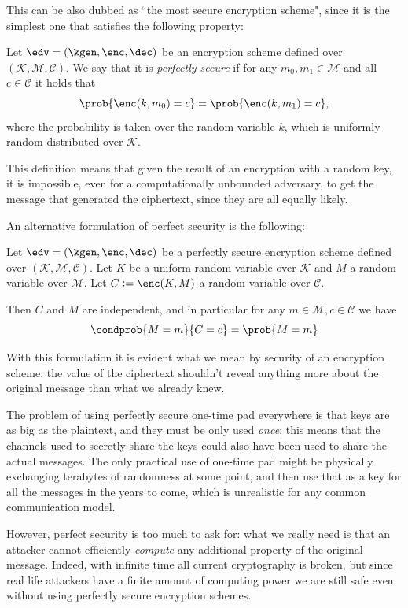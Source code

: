 This can be also dubbed as ``the most secure encryption scheme", since it is the simplest one that satisfies the following property:
\begin{definition}
    Let $\edv=(\kgen,\enc,\dec)$ be an encryption scheme defined over $(\mathcal K, \mathcal M, \mathcal C)$. We say that it is \emph{perfectly secure} if for any $m_0,m_1\in\mathcal M$ and all $c\in\mathcal C$ it holds that 
    $$\prob{\enc(k,m_0)=c} = \prob{\enc(k,m_1)=c},$$
    where the probability is taken over the random variable $k$, which is uniformly random distributed over $\mathcal K$.
\end{definition}

This definition means that given the result of an encryption with a random key, it is impossible, even for a computationally unbounded adversary, to get the message that generated the ciphertext, since they are all equally likely.

An alternative formulation of perfect security is the following:
\begin{proposition}
    Let $\edv=(\kgen,\enc,\dec)$ be a perfectly secure encryption scheme defined over $(\mathcal K, \mathcal M, \mathcal C)$. Let $K$ be a uniform random variable over $\mathcal K$ and $M$ a random variable over $\mathcal M$. Let $C:=\enc(K,M)$ a random variable over $\mathcal C$.
    
    Then $C$ and $M$ are independent, and in particular for any $m\in\mathcal M,c\in\mathcal C$ we have $$\condprob{M=m}{C=c} = \prob{M=m}$$
\end{proposition}

With this formulation it is evident what we mean by security of an encryption scheme: the value of the ciphertext shouldn't reveal anything more about the original message than what we already knew.

The problem of using  perfectly secure one-time pad everywhere is that keys are as big as the plaintext, and they must be only used \emph{once}; this means that the channels used to secretly share the keys could also have been used to share the actual messages. The only practical use of one-time pad might be physically exchanging terabytes of randomness at some point, and then use that as a key for all the messages in the years to come, which is unrealistic for any common communication model.

However, perfect security is too much to ask for: what we really need is that an attacker cannot efficiently \emph{compute} any additional property of the original message. Indeed, with infinite time all current cryptography is broken, but since real life attackers have a finite amount of computing power we are still safe even without using perfectly secure encryption schemes.

